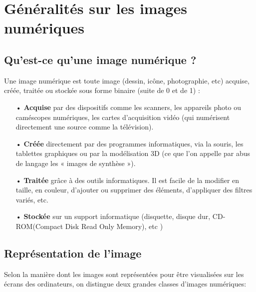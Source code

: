\section{Généralités sur les images numériques}
    \subsection{Qu'est-ce qu'une image numérique ?}
    Une image numérique est toute image (dessin, icône, photographie, etc) acquise, créée, traitée ou stockée sous forme binaire (suite de 0 et de 1) :
    \begin{itemize}
        \item[•]\textbf{Acquise} par des dispositifs comme les scanners, les appareils photo ou caméscopes numériques, les cartes d’acquisition vidéo (qui numérisent directement une source comme la télévision).
        \item[•]\textbf{Créée} directement par des programmes informatiques, via la souris, les tablettes graphiques ou par la modélisation 3D (ce que l’on appelle par abus de langage les « images de synthèse »).
        \item[•]\textbf{Traitée} grâce à des outils informatiques. Il est facile de la modifier en taille, en couleur, d’ajouter ou supprimer des éléments, d’appliquer des filtres variés, etc.
        \item[•]\textbf{Stockée} sur un support informatique (disquette, disque dur, CD-ROM(Compact Disk Read Only Memory), etc ) \cite{wikiImage}
    \end{itemize}
    \subsection{Représentation de l'image}
    Selon la manière dont les images sont représentées pour être visualisées sur les écrans des ordinateurs, on distingue deux grandes classes d’images numériques:

